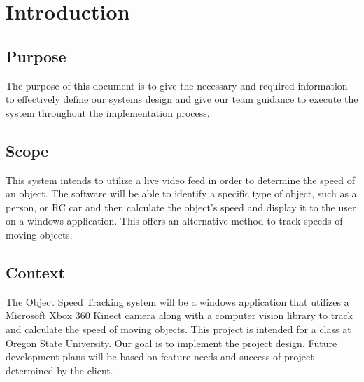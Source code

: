 \documentclass[onecolumn, draftclsnofoot,10pt, compsoc]{IEEEtran}
\begin{document}
\section{Introduction}
\subsection{Purpose}
The purpose of this document is to give the necessary and required information to effectively define our systems design and give our team guidance to execute the system throughout the implementation process.

\subsection{Scope}
This system intends to utilize a live video feed in order to determine the speed of an object.
The software will be able to identify a specific type of object, such as a person, or RC car and then calculate the object's speed and display it to the user on a windows application.
This offers an alternative method to track speeds of moving objects.


\subsection{Context}
The Object Speed Tracking system will be a windows application that utilizes a Microsoft Xbox 360 Kinect camera along with a computer vision library to track and calculate the speed of moving objects.
This project is intended for a class at Oregon State University. Our goal is to implement the project design.
Future development plans will be based on feature needs and success of project determined by the client.

\end{document}
